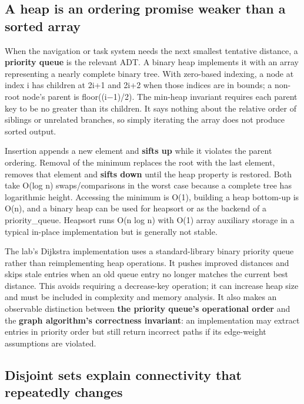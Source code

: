 \subsection{A heap is an ordering promise weaker than a sorted array}\label{01-foundations-i-ch007-a-heap-is-an-ordering-promise-weaker-than-a-sorted-array}

When the navigation or task system needs the next smallest tentative distance, a \textbf{priority queue} is the relevant ADT. A binary heap implements it with an array representing a nearly complete binary tree. With zero-based indexing, a node at index i has children at 2i+1 and 2i+2 when those indices are in bounds; a non-root node's parent is floor((i−1)/2). The min-heap invariant requires each parent key to be no greater than its children. It says nothing about the relative order of siblings or unrelated branches, so simply iterating the array does not produce sorted output.

Insertion appends a new element and \textbf{sifts up} while it violates the parent ordering. Removal of the minimum replaces the root with the last element, removes that element and \textbf{sifts down} until the heap property is restored. Both take O(log n) swaps/comparisons in the worst case because a complete tree has logarithmic height. Accessing the minimum is O(1), building a heap bottom-up is O(n), and a binary heap can be used for heapsort or as the backend of a priority\_queue. Heapsort runs O(n log n) with O(1) array auxiliary storage in a typical in-place implementation but is generally not stable.

The lab's Dijkstra implementation uses a standard-library binary priority queue rather than reimplementing heap operations. It pushes improved distances and skips stale entries when an old queue entry no longer matches the current best distance. This avoids requiring a decrease-key operation; it can increase heap size and must be included in complexity and memory analysis. It also makes an observable distinction between \textbf{the priority queue's operational order} and the \textbf{graph algorithm's correctness invariant}: an implementation may extract entries in priority order but still return incorrect paths if its edge-weight assumptions are violated.

\subsection{Disjoint sets explain connectivity that repeatedly changes}\label{01-foundations-i-ch007-disjoint-sets-explain-connectivity-that-repeatedly-changes}

